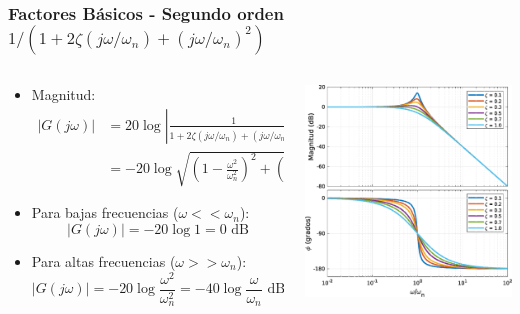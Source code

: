 \documentclass[aspectratio=169, handout]{beamer}
\theoremstyle{definition}
\theoremstyle{plain}
\theoremstyle{remark}
\begin{document}
\begin{frame}[<+->]\frametitle{Factores Básicos - Segundo orden $1/(1+2\zeta(j\omega/\omega_n)+(j\omega/\omega_n)^2)$}
\begin{columns}
	\begin{column}{0.5\textwidth}
	\begin{itemize}
		\item Magnitud:
		\begin{align*}
			\left| G(j\omega) \right| &= 20 \log \left| \frac{1}{1+2\zeta(j\omega/\omega_n)+(j\omega/\omega_n)^2} \right|\\
			&= -20 \log \sqrt{\left(1-\frac{\omega^2}{\omega_n^2}\right)^2+\left(2\zeta\frac{\omega}{\omega_n}\right)^2}
		\end{align*}
		\item Para bajas frecuencias ($\omega << \omega_n$):
		\begin{equation*}
			\left| G(j\omega) \right| = -20 \log 1 = 0 \text{ dB}
		\end{equation*}
		\item Para altas frecuencias ($\omega >> \omega_n$):
		\begin{equation*}
			\left| G(j\omega) \right| = -20 \log \frac{\omega^2}{\omega_n^2} = -40 \log \frac{\omega}{\omega_n} \text{ dB}
		\end{equation*}
	\end{itemize}
	\end{column}
	\begin{column}{0.5\textwidth}
	\centering
	\includegraphics[width=6.5cm]{images/bodeSecondOrderIntegral.eps}
	\end{column}
\end{columns}
\end{frame}
\end{document}
